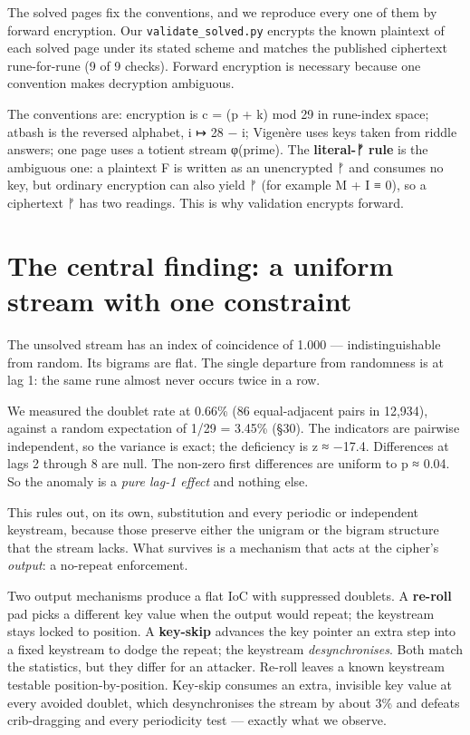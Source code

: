 \documentclass[11pt]{article}
\begin{document}
The solved pages fix the conventions, and we reproduce every one of them by forward encryption. Our \texttt{validate\_solved.py} encrypts the known plaintext of each solved page under its stated scheme and matches the published ciphertext rune-for-rune (9 of 9 checks). Forward encryption is necessary because one convention makes decryption ambiguous.


The conventions are: encryption is c = (p + k) mod 29 in rune-index space; atbash is the reversed alphabet, i ↦ 28 − i; Vigenère uses keys taken from riddle answers; one page uses a totient stream φ(prime). The \textbf{literal-ᚠ rule} is the ambiguous one: a plaintext F is written as an unencrypted ᚠ and consumes no key, but ordinary encryption can also yield ᚠ (for example M + I ≡ 0), so a ciphertext ᚠ has two readings. This is why validation encrypts forward.


\section{The central finding: a uniform stream with one constraint}

The unsolved stream has an index of coincidence of 1.000 — indistinguishable from random. Its bigrams are flat. The single departure from randomness is at lag 1: the same rune almost never occurs twice in a row.


We measured the doublet rate at 0.66\% (86 equal-adjacent pairs in 12,934), against a random expectation of 1/29 = 3.45\% (§30). The indicators are pairwise independent, so the variance is exact; the deficiency is z ≈ −17.4. Differences at lags 2 through 8 are null. The non-zero first differences are uniform to p ≈ 0.04. So the anomaly is a \emph{pure lag-1 effect} and nothing else.


This rules out, on its own, substitution and every periodic or independent keystream, because those preserve either the unigram or the bigram structure that the stream lacks. What survives is a mechanism that acts at the cipher's \emph{output}: a no-repeat enforcement.


Two output mechanisms produce a flat IoC with suppressed doublets. A \textbf{re-roll} pad picks a different key value when the output would repeat; the keystream stays locked to position. A \textbf{key-skip} advances the key pointer an extra step into a fixed keystream to dodge the repeat; the keystream \emph{desynchronises}. Both match the statistics, but they differ for an attacker. Re-roll leaves a known keystream testable position-by-position. Key-skip consumes an extra, invisible key value at every avoided doublet, which desynchronises the stream by about 3\% and defeats crib-dragging and every periodicity test — exactly what we observe.
\end{document}
